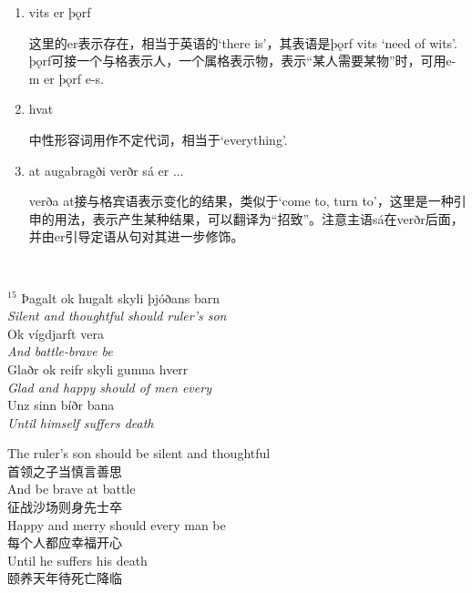 \begin{grammar*}{}
    \begin{enumerate}[leftmargin=*]
        \item vits er þǫrf

              这里的er表示存在，相当于英语的`there is'，其表语是þǫrf vits `need of wits'. þǫrf可接一个与格表示人，一个属格表示物，表示“某人需要某物”时，可用e-m er þǫrf e-s.

        \item hvat

              中性形容词用作不定代词，相当于`everything'.

        \item at augabragði verðr sá er ...

              verða at接与格宾语表示变化的结果，类似于`come to, turn to'，这里是一种引申的用法，表示产生某种结果，可以翻译为“招致”。注意主语sá在verðr后面，并由er引导定语从句对其进一步修饰。
    \end{enumerate}
\end{grammar*}
\hspace*{\fill}\\ %
\begin{paracol}{2}
    \noindent
    $^{15}$ Þagalt ok hugalt skyli þjóðans barn\\
    \textit{Silent and thoughtful should ruler's son }\\
    Ok vígdjarft vera\\
    \textit{And battle-brave be}\\
    Glaðr ok reifr skyli gumna hverr\\
    \textit{Glad and happy should of men every}\\
    Unz sinn bíðr bana\\
    \textit{Until himself suffers death}\\
    \switchcolumn

    \noindent
    The ruler's son should be silent and thoughtful\\
    首领之子当慎言善思\\
    And be brave at battle\\
    征战沙场则身先士卒\\
    Happy and merry should every man be\\
    每个人都应幸福开心\\
    Until he suffers his death\\
    颐养天年待死亡降临\\

\end{paracol}
